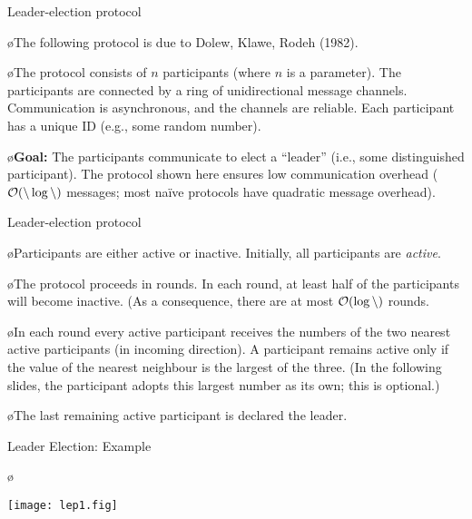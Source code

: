 \documentclass{beamer}
\begin{document}

\begin{frame}{Leader-election protocol}

\o The following protocol is due to Dolew, Klawe, Rodeh (1982).

\o The protocol consists of $n$ participants (where $n$ is a parameter).
   The participants are connected by a ring of unidirectional message channels.
   Communication is asynchronous, and the channels are reliable. Each
   participant has a unique ID (e.g., some random number).

\o \textbf{Goal:} The participants communicate to elect a ``leader''
   (i.e., some distinguished participant). The protocol shown here
   ensures low communication overhead ($\cal O(n\log n)$ messages;
   most naïve protocols have quadratic message overhead).

\end{frame}


\begin{frame}{Leader-election protocol}

\o Participants are either active or inactive.
   Initially, all participants are \emph{active}.

\o The protocol proceeds in rounds. In each round, at least
   half of the participants will become inactive. (As a consequence,
   there are at most $\cal O(\log n)$ rounds.

\o In each round every active participant receives the numbers
   of the two nearest active participants (in incoming direction).
   A participant remains active only if the value of the nearest
   neighbour is the largest of the three. (In the following slides, the
   participant adopts this largest number as its own; this is optional.)

\o The last remaining active participant is declared the leader.

\end{frame}


\begin{frame}{Leader Election: Example}

\o \centerline{\texttt{[image: lep1.fig]}}

\end{frame}
\end{document}
